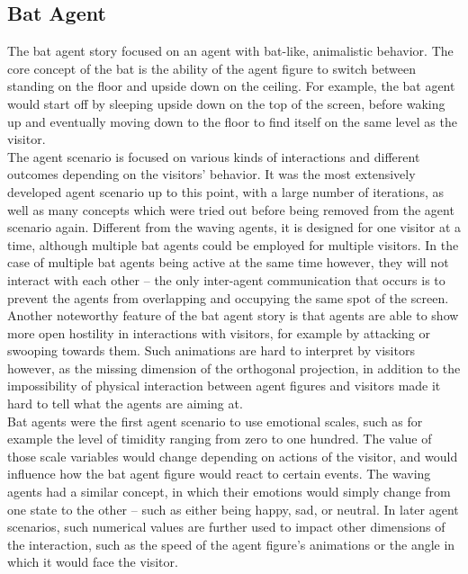 \documentclass[draft,final]{vutinfth} %
\begin{document}
\subsection{Bat Agent}
\label{chap:bat}

The bat agent story focused on an agent with bat-like, animalistic behavior. 
The core concept of the bat is the ability of the \gls{agent figure} to switch between standing on the floor and upside down on the ceiling. 
For example, the bat agent would start off by sleeping upside down on the top of the screen, before waking up and eventually moving down to the floor to find itself on the same level as the \gls{visitor}. \\
The agent scenario is focused on various kinds of interactions and different outcomes depending on the \glspl{visitor}’ behavior. 
It was the most extensively developed agent scenario up to this point, with a large number of iterations, as well as many concepts which were tried out before being removed from the agent scenario again. 
Different from the waving agents, it is designed for one \gls{visitor} at a time, although multiple bat agents could be employed for multiple \glspl{visitor}. 
In the case of multiple bat agents being active at the same time however, they will not interact with each other – the only inter-agent communication that occurs is to prevent the agents from overlapping and occupying the same spot of the screen. \\
Another noteworthy feature of the bat agent story is that agents are able to show more open hostility in interactions with \glspl{visitor}, for example by attacking or swooping towards them. 
Such animations are hard to interpret by \glspl{visitor} however, as the missing dimension of the orthogonal projection, in addition to the impossibility of physical interaction between \glspl{agent figure} and \glspl{visitor} made it hard to tell what the agents are aiming at. \\
Bat agents were the first agent scenario to use emotional scales, such as for example the level of timidity ranging from zero to one hundred. 
The value of those scale variables would change depending on actions of the \gls{visitor}, and would influence how the bat \gls{agent figure} would react to certain events. 
The waving agents had a similar concept, in which their emotions would simply change from one state to the other – such as either being happy, sad, or neutral. 
In later agent scenarios, such numerical values are further used to impact other dimensions of the interaction, such as the speed of the \gls{agent figure}’s animations or the angle in which it would face the \gls{visitor}. \\
\end{document}
